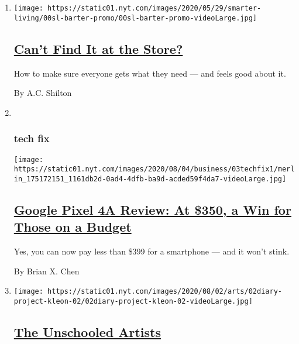 \begin{enumerate}
\def\labelenumi{\arabic{enumi}.}
\item
  \texttt{[image: https://static01.nyt.com/images/2020/05/29/smarter-living/00sl-barter-promo/00sl-barter-promo-videoLarge.jpg]}

  \hypertarget{cant-find-it-at-the-store}{%
  \subsection{\texorpdfstring{\href{/2020/08/03/smarter-living/coronavirus-how-to-trade-barter.html}{Can't
  Find It at the
  Store?}}{Can't Find It at the Store?}}\label{cant-find-it-at-the-store}}

  How to make sure everyone gets what they need --- and feels good about
  it.

  By A.C. Shilton
\item ~
  \hypertarget{tech-fix}{%
  \subsubsection{tech fix}\label{tech-fix}}

  \texttt{[image: https://static01.nyt.com/images/2020/08/04/business/03techfix1/merlin\_175172151\_1161db2d-0ad4-4dfb-ba9d-acded59f4da7-videoLarge.jpg]}

  \hypertarget{google-pixel-4a-review-at-350-a-win-for-those-on-a-budget}{%
  \subsection{\texorpdfstring{\href{/2020/08/03/technology/personaltech/google-pixel-4a-review.html}{Google
  Pixel 4A Review: At \$350, a Win for Those on a
  Budget}}{Google Pixel 4A Review: At \$350, a Win for Those on a Budget}}\label{google-pixel-4a-review-at-350-a-win-for-those-on-a-budget}}

  Yes, you can now pay less than \$399 for a smartphone --- and it won't
  stink.

  By Brian X. Chen
\item
  \texttt{[image: https://static01.nyt.com/images/2020/08/02/arts/02diary-project-kleon-02/02diary-project-kleon-02-videoLarge.jpg]}

  \hypertarget{the-unschooled-artists}{%
  \subsection{\texorpdfstring{\href{/2020/07/31/arts/quarantine-parenting-art.html}{The
  Unschooled
  Artists}}{The Unschooled Artists}}\label{the-unschooled-artists}}


\end{enumerate}

